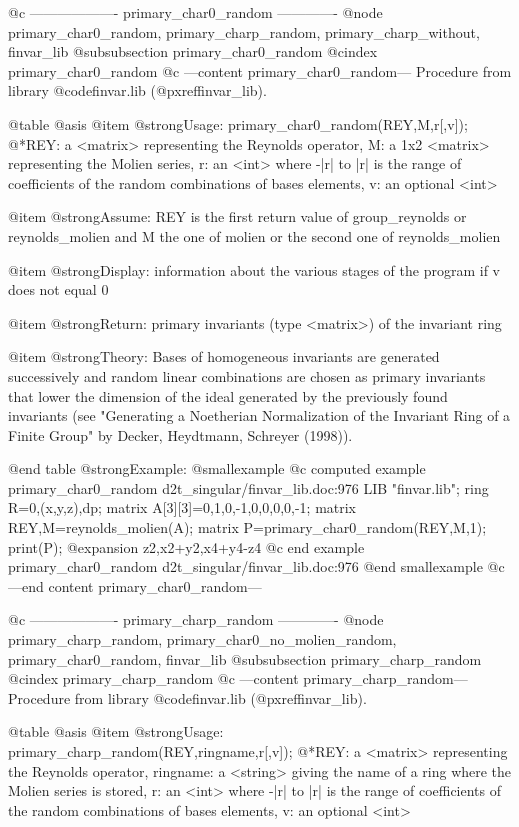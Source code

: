 @c ------------------- primary_char0_random -------------
@node primary_char0_random, primary_charp_random, primary_charp_without, finvar_lib
@subsubsection primary_char0_random
@cindex primary_char0_random
@c ---content primary_char0_random---
Procedure from library @code{finvar.lib} (@pxref{finvar_lib}).

@table @asis
@item @strong{Usage:}
primary_char0_random(REY,M,r[,v]);
@*REY: a <matrix> representing the Reynolds operator, M: a 1x2 <matrix>
representing the Molien series, r: an <int> where -|r| to |r| is the
range of coefficients of the random combinations of bases elements,
v: an optional <int>

@item @strong{Assume:}
REY is the first return value of group_reynolds or reynolds_molien and
M the one of molien or the second one of reynolds_molien

@item @strong{Display:}
information about the various stages of the program if v does not
equal 0

@item @strong{Return:}
primary invariants (type <matrix>) of the invariant ring

@item @strong{Theory:}
Bases of homogeneous invariants are generated successively and random
linear combinations are chosen as primary invariants that lower the
dimension of the ideal generated by the previously found invariants
(see "Generating a Noetherian Normalization of the Invariant Ring of
a Finite Group" by Decker, Heydtmann, Schreyer (1998)).

@end table
@strong{Example:}
@smallexample
@c computed example primary_char0_random d2t_singular/finvar_lib.doc:976 
LIB "finvar.lib";
ring R=0,(x,y,z),dp;
matrix A[3][3]=0,1,0,-1,0,0,0,0,-1;
matrix REY,M=reynolds_molien(A);
matrix P=primary_char0_random(REY,M,1);
print(P);
@expansion{} z2,x2+y2,x4+y4-z4
@c end example primary_char0_random d2t_singular/finvar_lib.doc:976
@end smallexample
@c ---end content primary_char0_random---

@c ------------------- primary_charp_random -------------
@node primary_charp_random, primary_char0_no_molien_random, primary_char0_random, finvar_lib
@subsubsection primary_charp_random
@cindex primary_charp_random
@c ---content primary_charp_random---
Procedure from library @code{finvar.lib} (@pxref{finvar_lib}).

@table @asis
@item @strong{Usage:}
primary_charp_random(REY,ringname,r[,v]);
@*REY: a <matrix> representing the Reynolds operator, ringname: a
<string> giving the name of a ring where the Molien series is stored,
r: an <int> where -|r| to |r| is the range of coefficients of the
random combinations of bases elements, v: an optional <int>

